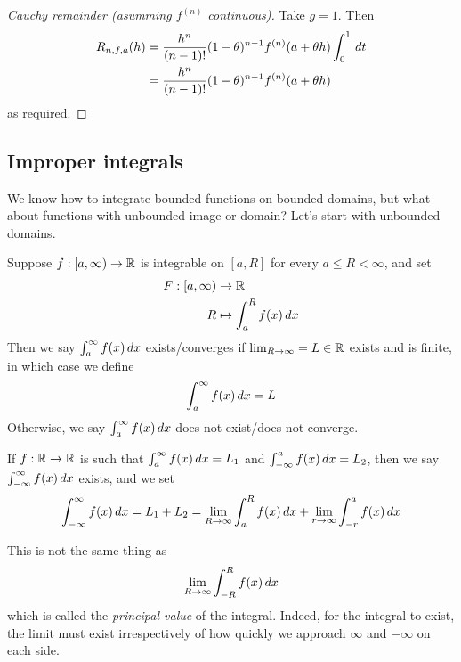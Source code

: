 \documentclass{../../template/note}
\begin{document}
    \begin{proof}[Cauchy remainder (\emph{asumming \(f^{(n)}\) continuous})]
        Take \(g=1\). Then
        \begin{align*}
            R_{n,f,a}(h) &= \frac{h^n}{(n-1)!} (1-\theta)^{n-1} f^{(n)}(a+\theta h) \int_0^1 \,d{t} \\
            &= \frac{h^n}{(n-1)!} (1-\theta)^{n-1} f^{(n)}(a+\theta h)
        \end{align*}
        as required.
    \end{proof}
    
    \subsection{Improper integrals}

    We know how to integrate bounded functions on bounded domains, but what about functions with unbounded image or domain? Let's start with unbounded domains.

    \begin{definition}
        Suppose \(f: [a, \infty) \to \mathbb R\) is integrable on \([a, R]\) for every \(a \leq R < \infty\), and set
        \begin{align*}
            F: [a, \infty) &\to \mathbb R \\
            R &\mapsto \int_a^R f(x) \,d{x}
        \end{align*}
        Then we say \(\int_a^\infty f(x) \,d{x}\) exists/converges if \(\lim_{R \to \infty} = L \in \mathbb R\) exists and is finite, in which case we define
        \begin{align*}
            \int_a^\infty f(x) \,d{x} = L
        \end{align*}
        Otherwise, we say \(\int_a^\infty f(x) \,d{x}\) does not exist/does not converge.
        
        If \(f: \mathbb R \to \mathbb R\) is such that \(\int_a^\infty f(x) \,d{x} = L_1\) and \(\int_{-\infty}^a f(x) \,d{x} = L_2\), then we say \(\int_{-\infty}^\infty f(x) \,d{x}\) exists, and we set
        \begin{align*}
            \int_{-\infty}^\infty f(x) \,d{x} = L_1 + L_2 = \lim_{R \to \infty} \int_a^R f(x) \,d{x} + \lim_{r \to \infty} \int_{-r}^a f(x) \,d{x}
        \end{align*}
    \end{definition}
    
    \begin{remark*}
        This is not the same thing as
        \begin{align*}
            \lim_{R \to \infty} \int_{-R}^R f(x) \,d{x}
        \end{align*}
        which is called the \emph{principal value} of the integral. Indeed, for the integral to exist, the limit must exist irrespectively of how quickly we approach \(\infty\) and \(-\infty\) on each side.        
    \end{remark*}
    
\end{document}
